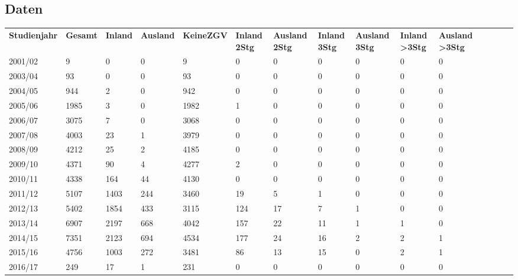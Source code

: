 \documentclass [a4paper,abstracton,titlepage]{scrartcl}
\begin{document}
\subsection{Daten}
\label{_daten}
  \par\noindent
 \begin{tabular}{lllllllllllllll
 }
 
{\bfseries{}Studienjahr} &
{\bfseries{}Gesamt} &
{\bfseries{}Inland} &
{\bfseries{}Ausland} &
{\bfseries{}KeineZGV} &
{\bfseries{}Inland 2Stg} &
{\bfseries{}Ausland 2Stg} &
{\bfseries{}Inland 3Stg} &
{\bfseries{}Ausland 3Stg} &
{\bfseries{}Inland \textgreater{}3Stg} &
{\bfseries{}Ausland \textgreater{}3Stg} 
 \tabularnewline
 
2001/02 &
9 &
0 &
0 &
9 &
0 &
0 &
0 &
0 &
0 &
0 %
 \tabularnewline

2003/04 &
93 &
0 &
0 &
93 &
0 &
0 &
0 &
0 &
0 &
0 %
 \tabularnewline

2004/05 &
944 &
2 &
0 &
942 &
0 &
0 &
0 &
0 &
0 &
0 %
 \tabularnewline

2005/06 &
1985 &
3 &
0 &
1982 &
1 &
0 &
0 &
0 &
0 &
0 %
 \tabularnewline

2006/07 &
3075 &
7 &
0 &
3068 &
0 &
0 &
0 &
0 &
0 &
0 %
 \tabularnewline

2007/08 &
4003 &
23 &
1 &
3979 &
0 &
0 &
0 &
0 &
0 &
0 %
 \tabularnewline

2008/09 &
4212 &
25 &
2 &
4185 &
0 &
0 &
0 &
0 &
0 &
0 %
 \tabularnewline

2009/10 &
4371 &
90 &
4 &
4277 &
2 &
0 &
0 &
0 &
0 &
0 %
 \tabularnewline

2010/11 &
4338 &
164 &
44 &
4130 &
0 &
0 &
0 &
0 &
0 &
0 %
 \tabularnewline

2011/12 &
5107 &
1403 &
244 &
3460 &
19 &
5 &
1 &
0 &
0 &
0 %
 \tabularnewline

2012/13 &
5402 &
1854 &
433 &
3115 &
124 &
17 &
7 &
1 &
0 &
0 %
 \tabularnewline

2013/14 &
6907 &
2197 &
668 &
4042 &
157 &
22 &
11 &
1 &
1 &
0 %
 \tabularnewline

2014/15 &
7351 &
2123 &
694 &
4534 &
177 &
24 &
16 &
2 &
2 &
1 %
 \tabularnewline

2015/16 &
4756 &
1003 &
272 &
3481 &
86 &
13 &
15 &
0 &
2 &
1 %
 \tabularnewline

2016/17 &
249 &
17 &
1 &
231 &
0 &
0 &
0 &
0 &
0 &
0 %
 \tabularnewline
 \end{tabular}
\end{document}
